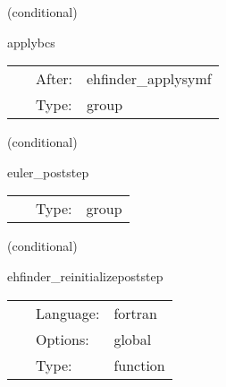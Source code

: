 \vspace{5mm}

   (conditional) 

\hspace{5mm} applybcs 

\hspace{5mm}{\it apply boundary conditions (symmetries) } 


\hspace{5mm}

 \begin{tabular*}{160mm}{cll} 
~ & After:  & ehfinder\_applysymf \\ 
~ & Type:  & group \\ 
\end{tabular*} 


\vspace{5mm}

\noindent {\bf }   (conditional) 

\hspace{5mm} euler\_poststep 

\hspace{5mm}{\it schedule group for euler re-initialization post step } 


\hspace{5mm}

 \begin{tabular*}{160mm}{cll} 
~ & Type:  & group \\ 
\end{tabular*} 


\vspace{5mm}

   (conditional) 

\hspace{5mm} ehfinder\_reinitializepoststep 

\hspace{5mm}{\it check if the re-initialization is done } 


\hspace{5mm}

 \begin{tabular*}{160mm}{cll} 
~ & Language:  & fortran \\ 
~ & Options:  & global \\ 
~ & Type:  & function \\ 
\end{tabular*} 


\vspace{5mm}

